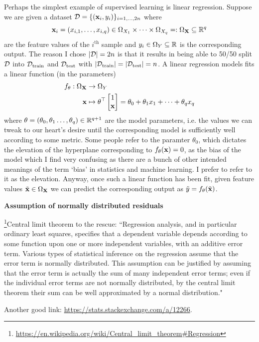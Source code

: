 \documentclass[11pt]{article}
\begin{document}
Perhaps the simplest example of supervised learning is linear regression. Suppose we are given a dataset $\mathcal{D}=\{(\mathbf{x}_i,y_i)\}_{i=1,\dots,2n}$ where
$$
\mathbf{x}_i=(x_{i,1},\dots,x_{i, q})\in \Omega_{X_1}\times\dots\times \Omega_{X_q}=:\Omega_{\mathbf{X}}\subseteq\mathbb{R}^q
$$
are the feature values of the $i^{\text{th}}$ sample and $y_i\in \Omega_{Y}\subseteq\mathbb{R}$ is the corresponding output. The reason I chose $|\mathcal{D}|=2n$ is that it results in being able to 50/50 split $\mathcal{D}$ into $\mathcal{D}_{\text{train}}$ and $\mathcal{D}_{\text{test}}$ with $|\mathcal{D}_{\text{train}}|=|\mathcal{D}_{\text{test}}|=n$. A linear regression models fits a linear function (in the parameters)
\begin{align*}
    f_{\theta}:\Omega_{\mathbf{X}}&\rightarrow \Omega_Y\\
    \mathbf{x}&\mapsto
    \theta^{\top}
    \begin{bmatrix}
        1\\
        \mathbf{x}
    \end{bmatrix}
    =
    \theta_0+\theta_1x_1+\dots+\theta_qx_q    
\end{align*}
where $\theta=(\theta_0,\theta_1\dots,\theta_q)\in\mathbb{R}^{q+1}$ are the model parameters, i.e. the values we can tweak to our heart's desire until the corresponding model is sufficiently well according to some metric. Some people refer to the paramter $\theta_0$, which dictates the elevation of the hyperplane corresponding to $f_{\theta}(\mathbf{x})=0$, as the bias of the model which I find very confusing as there are a bunch of other intended meanings of the term `bias' in statistics and machine learning. I prefer to refer to it as the elevation. Anyway, once such a linear function has been fit, given feature values $\tilde{\mathbf{x}}\in\Omega_{\mathbf{X}}$ we can predict the corresponding output as $\tilde{y}=f_{\theta}(\tilde{\mathbf{x}})$.

\begin{tcolorbox}[colback=c2]
    \textbf{Assumption of normally distributed residuals}
    \vspace{5pt}

    \footnote{\url{https://en.wikipedia.org/wiki/Central\_limit\_theorem\#Regression}}Central limit theorem to the rescue: ``Regression analysis, and in particular ordinary least squares, specifies that a dependent variable depends according to some function upon one or more independent variables, with an additive error term. Various types of statistical inference on the regression assume that the error term is normally distributed. This assumption can be justified by assuming that the error term is actually the sum of many independent error terms; even if the individual error terms are not normally distributed, by the central limit theorem their sum can be well approximated by a normal distribution."

    \vspace{10pt}
    Another good link: \url{https://stats.stackexchange.com/a/12266}.
\end{tcolorbox}
\end{document}
